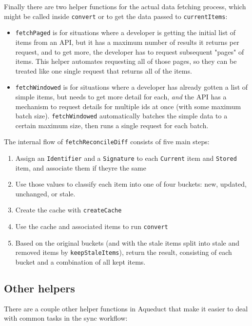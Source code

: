 \documentclass[manuscript,review,anonymous]{acmart}
\begin{document}
Finally there are two helper functions for the actual data fetching
process, which might be called inside \texttt{convert} or to get the
data passed to \texttt{currentItems}:

\begin{itemize}
\tightlist
\item
  \texttt{fetchPaged} is for situations where a developer is getting the
  initial list of items from an API, but it has a maximum number of
  results it returns per request, and to get more, the developer has to
  request subsequent "pages" of items. This helper automates requesting
  all of those pages, so they can be treated like one single request
  that returns all of the items.
\item
  \texttt{fetchWindowed} is for situations where a developer has already
  gotten a list of simple items, but needs to get more detail for each,
  \emph{and} the API has a mechanism to request details for multiple ids
  at once (with some maximum batch size). \texttt{fetchWindowed}
  automatically batches the simple data to a certain maximum size, then
  runs a single request for each batch.
\end{itemize}

The internal flow of \texttt{fetchReconcileDiff} consists of five main
steps:

\begin{enumerate}
\tightlist
\item
  Assign an \texttt{Identifier} and a \texttt{Signature} to each
  \texttt{Current} item and \texttt{Stored} item, and associate them if
  they\textquotesingle re the same
\item
  Use those values to classify each item into one of four buckets: new,
  updated, unchanged, or stale.
\item
  Create the cache with \texttt{createCache}
\item
  Use the cache and associated items to run \texttt{convert}
\item
  Based on the original buckets (and with the stale items split into
  stale and removed items by \texttt{keepStaleItems}), return the
  result, consisting of each bucket and a combination of all kept items.
\end{enumerate}

\subsection{Other helpers}
There are a couple other helper functions in Aqueduct that make it
easier to deal with common tasks in the sync workflow:
\end{document}
